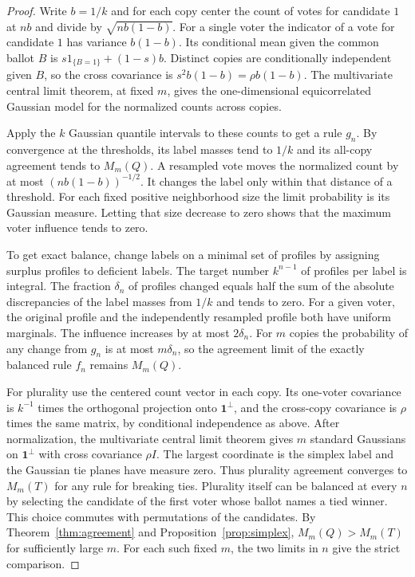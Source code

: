 \documentclass[11pt,reqno]{amsart}
\newcommand{\one}{\mathbf 1}
\begin{document}
\begin{proof}
Write $b=1/k$ and for each copy center the count of votes for
candidate $1$ at $nb$ and divide by $\sqrt{nb(1-b)}$. For a single
voter the indicator of a vote for candidate $1$ has variance
$b(1-b)$. Its conditional mean given the common ballot $B$ is
$s1_{\{B=1\}}+(1-s)b$. Distinct copies are conditionally independent
given $B$, so the cross covariance is $s^2 b(1-b)=\rho b(1-b)$.
The multivariate central limit theorem, at fixed $m$, gives the
one-dimensional equicorrelated Gaussian model for the normalized
counts across copies.

Apply the $k$ Gaussian quantile intervals to these counts to get a
rule $g_n$. By convergence at the thresholds, its label masses tend
to $1/k$ and its all-copy agreement tends to $M_m(Q)$. A resampled
vote moves the normalized count by at most $(nb(1-b))^{-1/2}$.
It changes the label only within that distance of a threshold.
For each fixed positive neighborhood size the limit probability
is its Gaussian measure. Letting that size decrease to zero
shows that the maximum voter influence tends to zero.

To get exact balance, change labels on a minimal set of profiles
by assigning surplus profiles to deficient labels. The target
number $k^{n-1}$ of profiles per label is integral. The fraction
$\delta_n$ of profiles changed equals half the sum of the
absolute discrepancies of the label masses from $1/k$ and tends
to zero. For a given voter, the original profile and the
independently resampled profile both have uniform marginals. The
influence increases by at most $2\delta_n$. For $m$ copies the
probability of any change from $g_n$ is at most $m\delta_n$, so
the agreement limit of the exactly balanced rule $f_n$ remains
$M_m(Q)$.

For plurality use the centered count vector in each copy. Its
one-voter covariance is $k^{-1}$ times the orthogonal projection
onto $\one^\perp$, and the cross-copy covariance is $\rho$
times the same matrix, by conditional independence as above.
After normalization, the multivariate central limit theorem
gives $m$ standard Gaussians on $\one^\perp$ with cross covariance
$\rho I$. The largest coordinate is the simplex label and the
Gaussian tie planes have measure zero. Thus plurality agreement
converges to $M_m(T)$ for any rule for breaking ties. Plurality
itself can be balanced at every $n$ by selecting the candidate of the
first voter whose ballot names a tied winner. This choice commutes
with permutations of the candidates.
By Theorem~\ref{thm:agreement} and Proposition~\ref{prop:simplex},
$M_m(Q)>M_m(T)$ for sufficiently large $m$. For each such fixed $m$, the two limits in $n$ give the
strict comparison.
\end{proof}
\end{document}
